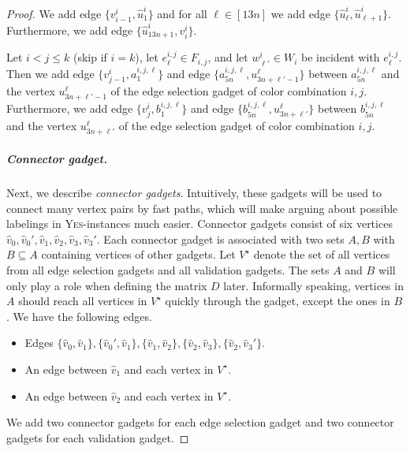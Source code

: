 \documentclass[a4paper,UKenglish,cleveref, autoref, thm-restate]{lipics-v2021}
\begin{document}
\begin{proof}
    We add edge $\{v^i_{i-1},\hat{u}^i_1\}$ and for all $\ell\in[13n]$ we add edge $\{\hat{u}^i_\ell,\hat{u}^i_{\ell+1}\}$. Furthermore, we add edge $\{\hat{u}^i_{13n+1},v^i_i\}$. 

    Let $i<j\le k$ (skip if $i=k$), let $e_\ell^{i,j}\in F_{i,j}$, and let $w^i_{\ell'}\in W_i$ be incident with $e_\ell^{i,j}$. Then we add edge $\{v_{j-1}^i,a^{i,j,\ell}_{1}\}$ and edge $\{a^{i,j,\ell}_{5n},u^\ell_{3n+\ell'-1}\}$ between $a^{i,j,\ell}_{5n}$ and the vertex $u^\ell_{3n+\ell'-1}$ of the edge selection gadget of color combination $i,j$.
    Furthermore, we add edge $\{v_{j}^i,b^{i,j,\ell}_{1}\}$ and edge $\{b^{i,j,\ell}_{5n},u^\ell_{3n+\ell'}\}$ between $b^{i,j,\ell}_{5n}$ and the vertex $u^\ell_{3n+\ell'}$ of the edge selection gadget of color combination $i,j$.


    \subparagraph{Connector gadget.} Next, we describe \emph{connector gadgets}. Intuitively, these gadgets will be used to connect many vertex pairs by fast paths, which will make arguing about possible labelings in \textsc{Yes}-instances much easier. Connector gadgets consist of six vertices $\hat{v}_0,\hat{v}_0',\hat{v}_1,\hat{v}_2,\hat{v}_3,\hat{v}_3'$. 
    Each connector gadget is associated with two sets $A,B$ with $B\subseteq A$ containing vertices of other gadgets. 
    Let $V^\star$ denote the set of all vertices from all edge selection gadgets and all validation gadgets.
    The sets $A$ and $B$ will only play a role when defining the matrix $D$ later. Informally speaking, vertices in $A$ should reach all vertices in $V^\star$ quickly through the gadget, except the ones in $B$.
    We have the following edges. 
    \begin{itemize}
        \item Edges $\{\hat{v}_0,\hat{v}_1\},\{\hat{v}_0',\hat{v}_1\},\{\hat{v}_1,\hat{v}_2\},\{\hat{v}_2,\hat{v}_3\},\{\hat{v}_2,\hat{v}_3'\}$.
        \item An edge between $\hat{v}_1$ and each vertex in $V^\star$.
        \item An edge between $\hat{v}_2$ and each vertex in $V^\star$.
    \end{itemize}
    We add two connector gadgets for each edge selection gadget and two connector gadgets for each validation gadget.
    

\end{proof}
\end{document}
